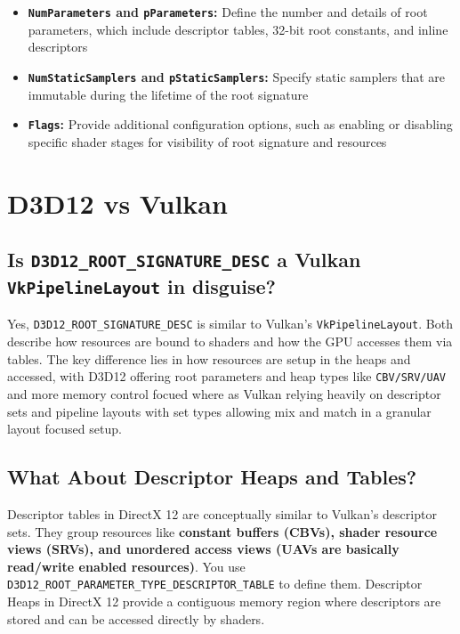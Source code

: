 \documentclass{article}
\begin{document}
\begin{itemize}
    \item \textbf{\lstinline{NumParameters} and \lstinline{pParameters}:} Define the number and details of root parameters, which include descriptor tables, 32-bit root constants, and inline descriptors
    \item \textbf{\lstinline{NumStaticSamplers} and \lstinline{pStaticSamplers}:} Specify static samplers that are immutable during the lifetime of the root signature
    \item \textbf{\lstinline{Flags}:} Provide additional configuration options, such as enabling or disabling specific shader stages for visibility of root signature and resources
\end{itemize}

\section*{D3D12 vs Vulkan}

\subsection*{Is \lstinline{D3D12_ROOT_SIGNATURE_DESC} a Vulkan \lstinline{VkPipelineLayout} in disguise?}

Yes, \lstinline{D3D12_ROOT_SIGNATURE_DESC} is similar to Vulkan's \lstinline{VkPipelineLayout}. Both describe how resources are bound to shaders and how the GPU accesses them via tables. The key difference lies in how resources are setup in the heaps and accessed, with D3D12 offering root parameters and heap types like \lstinline{CBV/SRV/UAV} and more memory control focued where as Vulkan relying
heavily on descriptor sets and pipeline layouts with set types allowing mix and match in a granular layout focused setup.

\subsection*{What About Descriptor Heaps and Tables?}
Descriptor tables in DirectX 12 are conceptually similar to Vulkan's descriptor sets. They group resources like \textbf{constant buffers (CBVs), shader resource views (SRVs), and unordered access views (UAVs are basically read/write enabled resources)}. You use\\  \lstinline{D3D12_ROOT_PARAMETER_TYPE_DESCRIPTOR_TABLE} to define them. Descriptor Heaps in DirectX 12 provide a contiguous memory region where descriptors are stored and can be accessed directly by shaders. \\
\end{document}
